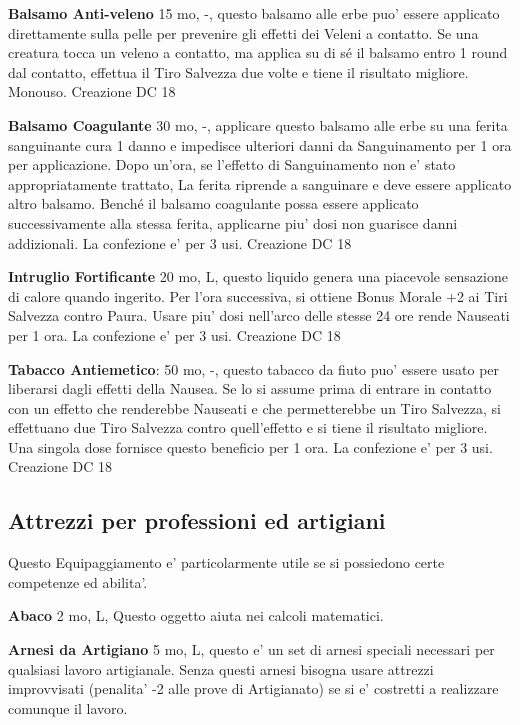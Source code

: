 \documentclass[a4paper,11pt,twoside,openany]{book}
\begin{document}
{\textbf{Balsamo Anti-veleno} 15 mo, -, questo balsamo alle erbe puo' essere applicato direttamente sulla pelle per prevenire gli effetti dei Veleni a contatto. Se una creatura tocca un veleno a contatto, ma applica su di sé il balsamo entro 1 round dal contatto, effettua il Tiro Salvezza due volte e tiene il risultato migliore. Monouso. Creazione DC 18

\textbf{Balsamo Coagulante} 30 mo, -, applicare questo balsamo alle erbe su una ferita sanguinante cura 1 danno e impedisce ulteriori danni da Sanguinamento per 1 ora per applicazione. Dopo un'ora, se l'effetto di Sanguinamento non e' stato appropriatamente trattato, 
La ferita riprende a sanguinare e deve essere applicato altro balsamo. Benché il balsamo coagulante possa essere applicato successivamente alla stessa ferita, applicarne piu' dosi non guarisce danni addizionali. La confezione e' per 3 usi. Creazione DC 18

\textbf{Intruglio Fortificante} 20 mo, L, questo liquido genera una piacevole sensazione di calore quando ingerito. Per l'ora successiva, si ottiene Bonus Morale +2 ai Tiri Salvezza contro Paura. Usare piu' dosi nell'arco delle stesse 24 ore rende Nauseati per 1 ora. La confezione e' per 3 usi. Creazione DC 18

\textbf{Tabacco Antiemetico}: 50 mo, -, questo tabacco da fiuto puo' essere usato per liberarsi dagli effetti della Nausea. Se lo si assume prima di entrare in contatto con un effetto che renderebbe Nauseati e che permetterebbe un Tiro Salvezza, si effettuano due Tiro Salvezza contro quell'effetto e si tiene il risultato migliore. Una singola dose fornisce questo beneficio per 1 ora. La confezione e’ per 3 usi. Creazione DC 18

\pagebreak

\subsection{Attrezzi per professioni ed artigiani}

\label{attrezzi-per-professioni-ed-artigiani}

Questo Equipaggiamento e' particolarmente utile se si possiedono certe competenze ed abilita'.

\textbf{Abaco} 2 mo, L, Questo oggetto aiuta nei calcoli matematici.

\textbf{Arnesi da Artigiano} 5 mo, L, questo e' un set di arnesi speciali necessari per qualsiasi lavoro artigianale. Senza questi arnesi bisogna usare attrezzi improvvisati (penalita' -2 alle prove di Artigianato) se si e' costretti a realizzare comunque il lavoro.

}
\end{document}
